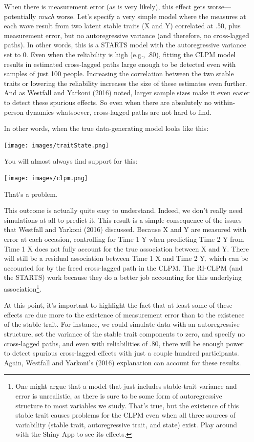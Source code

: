 \documentclass[
  english,
  man,floatsintext]{apa6}
\begin{document}
When there is measurement error (as is very likely), this effect gets worse---potentially \emph{much} worse. Let's specify a very simple model where the measures at each wave result from two latent stable traits (X and Y) correlated at .50, plus measurement error, but no autoregressive variance (and therefore, no cross-lagged paths). In other words, this is a STARTS model with the autoregressive variance set to 0. Even when the reliability is high (e.g., .80), fitting the CLPM model results in estimated cross-lagged paths large enough to be detected even with samples of just 100 people. Increasing the correlation between the two stable traits or lowering the reliability increases the size of these estimates even further. And as Westfall and Yarkoni (2016) noted, larger sample sizes make it even easier to detect these spurious effects. So even when there are absolutely no within-person dynamics whatsoever, cross-lagged paths are not hard to find.

In other words, when the true data-generating model looks like this:

\texttt{[image: images/traitState.png]}

You will almost always find support for this:

\texttt{[image: images/clpm.png]}

That's a problem.

This outcome is actually quite easy to understand. Indeed, we don't really need simulations at all to predict it. This result is a simple consequence of the issues that Westfall and Yarkoni (2016) discussed. Because X and Y are measured with error at each occasion, controlling for Time 1 Y when predicting Time 2 Y from Time 1 X does not fully account for the true association between X and Y. There will still be a residual association between Time 1 X and Time 2 Y, which can be accounted for by the freed cross-lagged path in the CLPM. The RI-CLPM (and the STARTS) work because they do a better job accounting for this underlying association\footnote{One might argue that a model that just includes stable-trait variance and error is unrealistic, as there is sure to be some form of autoregressive structure to most variables we study. That's true, but the existence of this stable trait causes problems for the CLPM even when all three sources of variability (stable trait, autoregressive trait, and state) exist. Play around with the Shiny App to see its effects.}.

At this point, it's important to highlight the fact that at least some of these effects are due more to the existence of measurement error than to the existence of the stable trait. For instance, we could simulate data with an autoregressive structure, set the variance of the stable trait components to zero, and specify no cross-lagged paths, and even with reliabilities of .80, there will be enough power to detect spurious cross-lagged effects with just a couple hundred participants. Again, Westfall and Yarkoni's (2016) explanation can account for these results.
\end{document}
